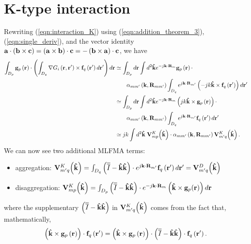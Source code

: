 \section{K-type interaction}
%
\par
Rewriting (\ref{eqn:interaction_K}) using (\ref{eqn:addition_theorem_3}), (\ref{eqn:single_deriv}), and the vector identity $\mathbf{a} \cdot \left(\mathbf{b}\times\mathbf{c}\right) = \left(\mathbf{a}\times\mathbf{b}\right) \cdot \mathbf{c} = -\left(\mathbf{b}\times\mathbf{a}\right) \cdot \mathbf{c}$, we have
\begin{equation}
\begin{split}
\int_{D_p} \mathbf{g}_p\left(\mathbf{r}\right) \cdot \left( \int_{D_q} \nabla G_i\left(\mathbf{r}, \mathbf{r}'\right) \times \mathbf{f}_q\left(\mathbf{r}'\right) d\mathbf{r}' \right) d\mathbf{r} &\simeq \int_{D_p}d \mathbf{r} \int d^2\mathbf{\hat{k}} e^{-j\mathbf{k} \cdot \mathbf{R}_{m}}\mathbf{g}_p\left(\mathbf{r}\right) \cdot \\ & \qquad \alpha_{mm'}\left(\mathbf{k}, \mathbf{R}_{mm'}\right) \int_{D_q}  e^{j\mathbf{k} \cdot \mathbf{R}_{m'}} \left(-jk \mathbf{\Hat{k}} \times \mathbf{f}_q\left(\mathbf{r}'\right) \right) d \mathbf{r}' \\
&\simeq \int_{D_p}d \mathbf{r} \int d^2\mathbf{\hat{k}} e^{-j\mathbf{k} \cdot \mathbf{R}_{m}}\left(jk \mathbf{\Hat{k}}\times\mathbf{g}_p\left(\mathbf{r}\right) \right) \cdot \\ & \qquad \alpha_{mm'}\left(\mathbf{k}, \mathbf{R}_{mm'}\right) \int_{D_q}  e^{j\mathbf{k} \cdot \mathbf{R}_{m'}}  \mathbf{f}_q\left(\mathbf{r}'\right) d \mathbf{r}' \\
&\simeq jk \int d^2\mathbf{\hat{k}} \; \mathbf{V}_{mp}^K \! \left(\mathbf{\hat{k}}\right) \cdot \alpha_{mm'}\left(\mathbf{k}, \mathbf{R}_{mm'} \right) \mathbf{V}_{m'q}^K \! \left(\mathbf{\hat{k}}\right).
\end{split}
\end{equation}
We can now see two additional MLFMA terms:
\begin{itemize}
\item aggregation: $\mathbf{V}_{m'q}^K \! \left(\mathbf{\hat{k}}\right) = \int_{D_q} \left( \overline{\overline{I}}-\mathbf{\hat{k}}\mathbf{\hat{k}} \right) \cdot e^{j\mathbf{k} \cdot \mathbf{R}_{m'}} \mathbf{f}_q\left(\mathbf{r}'\right) d \mathbf{r}' = \mathbf{V}_{m'q}^D \! \left(\mathbf{\hat{k}}\right)$
\item disaggregation: $\mathbf{V}_{mp}^K \! \left(\mathbf{\hat{k}}\right) = \int_{D_p} \left( \overline{\overline{I}}-\mathbf{\hat{k}}\mathbf{\hat{k}} \right) \cdot e^{-j\mathbf{k} \cdot \mathbf{R}_{m}} \left(\mathbf{\Hat{k}}\times\mathbf{g}_p\!\left(\mathbf{r}\right)\right) d \mathbf{r}$
\end{itemize}
where the supplementary $\left(\overline{\overline{I}}-\mathbf{\hat{k}}\mathbf{\hat{k}} \right)$ in $\mathbf{V}_{m'q}^K \! \left(\mathbf{\hat{k}}\right)$ comes from the fact that, mathematically, 
\begin{equation}
\left(\mathbf{\Hat{k}}\times\mathbf{g}_p\left(\mathbf{r}\right) \right) \cdot \mathbf{f}_q\left(\mathbf{r}'\right) = \left(\mathbf{\Hat{k}}\times\mathbf{g}_p\left(\mathbf{r}\right) \right) \cdot \left(\overline{\overline{I}}-\mathbf{\hat{k}}\mathbf{\hat{k}} \right) \cdot \mathbf{f}_q\left(\mathbf{r}'\right).
\end{equation}

